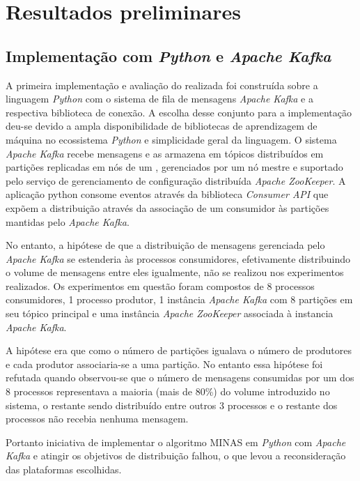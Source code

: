 \section{Resultados preliminares}\label{sec:resultados}


\newcommand{\kafka}{\emph{Apache Kafka}\xspace}
\newcommand{\python}{\emph{Python}\xspace}

\subsection{Implementação com \python e \kafka}

A primeira implementação e avaliação do \mfog realizada foi construída sobre a
linguagem \python com o sistema de fila de mensagens \kafka e a respectiva
biblioteca de conexão.
A escolha desse conjunto para a implementação deu-se devido a ampla
disponibilidade de bibliotecas de aprendizagem de máquina no ecossistema
\python e simplicidade geral da linguagem.
O sistema \kafka recebe mensagens e as armazena em tópicos distribuídos em
partições replicadas em nós de um \cluster, gerenciados por um nó mestre e
suportado pelo serviço de gerenciamento de configuração distribuída \emph{Apache
ZooKeeper}.
A aplicação python consome eventos através da biblioteca \emph{Consumer API}
que expõem a distribuição através da associação de um consumidor às partições
mantidas pelo \kafka.

No entanto, a hipótese de que a distribuição de mensagens gerenciada pelo \kafka
se estenderia às processos consumidores, efetivamente distribuindo o volume de
mensagens entre eles igualmente, não se realizou nos experimentos realizados.
Os experimentos em questão foram compostos de 8 processos consumidores, 1
processo produtor, 1 instância \kafka com 8 partições em seu tópico principal
e uma instância \emph{Apache ZooKeeper} associada à instancia \kafka.

A hipótese era que como o número de partições igualava o número de produtores e
cada produtor associaria-se a uma partição.
No entanto essa hipótese foi refutada quando observou-se que o número de
mensagens consumidas por um dos 8 processos representava a maioria (mais de
80\%) do volume introduzido no sistema, o restante sendo distribuído entre
outros 3 processos e o restante dos processos não recebia nenhuma mensagem.

Portanto iniciativa de implementar o algoritmo MINAS em \python com \kafka e
atingir os objetivos de distribuição falhou, o que levou a reconsideração das
plataformas escolhidas.

